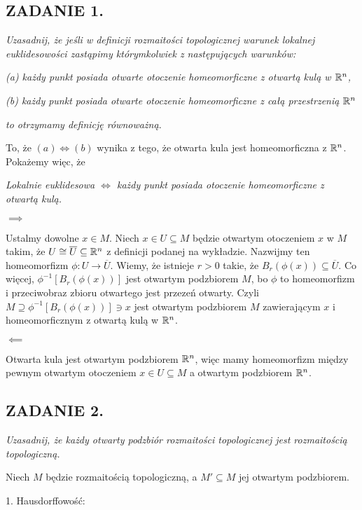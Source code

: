 
\usepackage{../../../notatki}


\subsection*{ZADANIE 1.}
\emph{\color{pink}Uzasadnij, że jeśli w definicji rozmaitości topologicznej warunek lokalnej euklidesowości zastąpimy którymkolwiek z następujących warunków:}

\emph{\color{pink}(a) każdy punkt posiada otwarte otoczenie homeomorficzne z otwartą kulą w $\mathbb{R}^n$,}

\emph{\color{pink}(b) każdy punkt posiada otwarte otoczenie homeomorficzne z całą przestrzenią $\mathbb{R}^n$}

\emph{\color{pink}to otrzymamy definicję równoważną.}
\medskip

To, że $(a)\iff(b)$ wynika z tego, że otwarta kula jest homeomorficzna z $\mathbb{R}^n$. Pokażemy więc, że

\emph{Lokalnie euklidesowa $\iff$ każdy punkt posiada otoczenie homeomorficzne z otwartą kulą.}

$\implies$

Ustalmy dowolne $x\in M$. Niech $x\in U\subseteq M$ będzie otwartym otoczeniem $x$ w $M$ takim, że $U\cong \overline U\subseteq\mathbb{R}^n$ z definicji podanej na wykładzie. Nazwijmy ten homeomorfizm $\phi:U\to\overline U$. Wiemy, że istnieje $r>0$ takie, że $B_r(\phi(x))\subseteq\overline U$. Co więcej, $\phi^{-1}[B_r(\phi(x))]$ jest otwartym podzbiorem $M$, bo $\phi$ to homeomorfizm i przeciwobraz zbioru otwartego jest przezeń otwarty. Czyli $M\supseteq \phi^{-1}[B_r(\phi(x))]\ni x$ jest otwartym podzbiorem $M$ zawierającym $x$ i homeomorficznym z otwartą kulą w $\mathbb{R}^n$.

$\impliedby$

Otwarta kula jest otwartym podzbiorem $\mathbb{R}^n$, więc mamy homeomorfizm między pewnym otwartym otoczeniem $x\in U\subseteq M$ a otwartym podzbiorem $\mathbb{R}^n$.

\subsection*{ZADANIE 2.}
\emph{\color{pink}Uzasadnij, że każdy otwarty podzbiór rozmaitości topologicznej jest rozmaitością topologiczną.}
\medskip

Niech $M$ będzie rozmaitością topologiczną, a $M'\subseteq M$ jej otwartym podzbiorem.

1. Hausdorffowość: 

